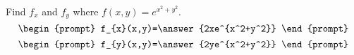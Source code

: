 \documentclass{ximera}
\author{David Guichard \and Neal Koblitz \and H. Jerome Keisler \and Albert Scheller \and Barry Balof \and Mike Wills \and Matthew Carr}
\begin{document}
\begin{exercise}




Find $f_x$ and $f_y$ where $f(x,y)=e^{x^2+y^2}$.
\[
\begin{prompt}
f_{x}(x,y)=\answer{2xe^{x^2+y^2}}
\end{prompt}
\]
\[
\begin{prompt}
f_{y}(x,y)=\answer{2ye^{x^2+y^2}}
\end{prompt}
\]

\end{exercise}
\end{document}
